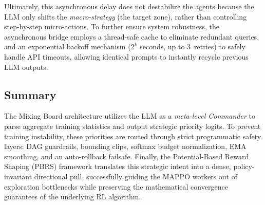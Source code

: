 Ultimately, this asynchronous delay does not destabilize the agents because the LLM only shifts the \emph{macro-strategy} (the target zone), rather than controlling step-by-step micro-actions. To further ensure system robustness, the asynchronous bridge employs a thread-safe cache to eliminate redundant queries, and an exponential backoff mechanism ($2^k$ seconds, up to 3~retries) to safely handle API timeouts, allowing identical prompts to instantly recycle previous LLM outputs.

\subsection{Summary}
\label{sec:dyn_summary}

The Mixing Board architecture utilizes the LLM as a \emph{meta-level Commander} to parse aggregate training statistics and output strategic priority logits. To prevent training instability, these priorities are routed through strict programmatic safety layers: DAG guardrails, bounding clips, softmax budget normalization, EMA smoothing, and an auto-rollback failsafe. Finally, the Potential-Based Reward Shaping (PBRS) framework translates this strategic intent into a dense, policy-invariant directional pull, successfully guiding the MAPPO workers out of exploration bottlenecks while preserving the mathematical convergence guarantees of the underlying RL algorithm.

